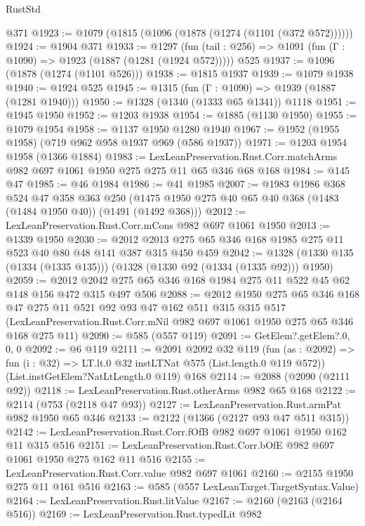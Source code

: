 \begin{lexlean}{RustStd}
\begin{coremodule}
    @371
@1923 := @1079 (@1815 (@1096 (@1878 (@1274 (@1101 (@372 @572))))))
@1924 := @1904 @371
@1933 := @1297
    (fun (tail : @256) => @1091 (fun (Γ : @1090) => @1923 (@1887 (@1281 (@1924 @572)))))
    @525
@1937 := @1096 (@1878 (@1274 (@1101 @526)))
@1938 := @1815 @1937
@1939 := @1079 @1938
@1940 := @1924 @525
@1945 := @1315 (fun (Γ : @1090) => @1939 (@1887 (@1281 @1940)))
@1950 := @1328 (@1340 (@1333 @65 @1341)) @1118
@1951 := @1945 @1950
@1952 := @1203 @1938
@1954 := @1885 (@1130 @1950)
@1955 := @1079 @1954
@1958 := @1137 @1950 @1280 @1940
@1967 := @1952 (@1955 @1958) (@719 @962 @958 @1937 @969 (@586 @1937))
@1971 := @1203 @1954 @1958 (@1366 @1884)
@1983 := LexLeanPreservation.Rust.Corr.matchArms
    @982
    @697
    @1061
    @1950
    @275
    @275
    @11
    @65
    @346
    @68
    @168
@1984 := @145 @47
@1985 := @46 @1984
@1986 := @41 @1985
@2007 := @1983
    @1986
    @368
    @524
    @47
    @358
    @363
    @250
    (@1475 @1950 @275 @40 @65 @40 @368 (@1483 (@1484 @1950 @40)) (@1491 (@1492 @368)))
@2012 := LexLeanPreservation.Rust.Corr.mCons @982 @697 @1061 @1950
@2013 := @1339 @1950
@2030 := @2012 @2013 @275 @65 @346 @168 @1985 @275 @11 @523 @40 @80 @48 @141 @387 @315 @450 @459
@2042 := @1328 (@1330 @135 (@1334 (@1335 @135))) (@1328 (@1330 @92 (@1334 (@1335 @92))) @1950)
@2059 := @2012 @2042 @275 @65 @346 @168 @1984 @275 @11 @522 @45 @62 @148 @156 @472 @315 @497 @506
@2088 := @2012
    @1950
    @275
    @65
    @346
    @168
    @47
    @275
    @11
    @521
    @92
    @93
    @47
    @162
    @511
    @315
    @315
    @517
    (LexLeanPreservation.Rust.Corr.mNil @982 @697 @1061 @1950 @275 @65 @346 @168 @275 @11)
@2090 := @585 (@557 @119)
@2091 := GetElem?.getElem?.{0, 0, 0}
@2092 := @6 @119
@2111 := @2091
    @2092
    @32
    @119
    (fun (as : @2092) => fun (i : @32) => LT.lt.{0} @32 instLTNat @575 (List.length.{0} @119 @572))
    (List.instGetElem?NatLtLength.{0} @119)
    @168
@2114 := @2088 (@2090 (@2111 @92))
@2118 := LexLeanPreservation.Rust.otherArms @982 @65 @168
@2122 := @2114 (@753 (@2118 @47 @93))
@2127 := LexLeanPreservation.Rust.armPat @982 @1950 @65 @346
@2133 := @2122 (@1366 (@2127 @93 @47 @511 @315))
@2142 := LexLeanPreservation.Rust.Corr.fOfB @982 @697 @1061 @1950 @162 @11 @315 @516
@2151 := LexLeanPreservation.Rust.Corr.bOfE @982 @697 @1061 @1950 @275 @162 @11 @516
@2155 := LexLeanPreservation.Rust.Corr.value @982 @697 @1061
@2160 := @2155 @1950 @275 @11 @161 @516
@2163 := @585 (@557 LexLeanTarget.TargetSyntax.Value)
@2164 := LexLeanPreservation.Rust.litValue
@2167 := @2160 (@2163 (@2164 @516))
@2169 := LexLeanPreservation.Rust.typedLit @982

\end{coremodule}
\end{lexlean}
